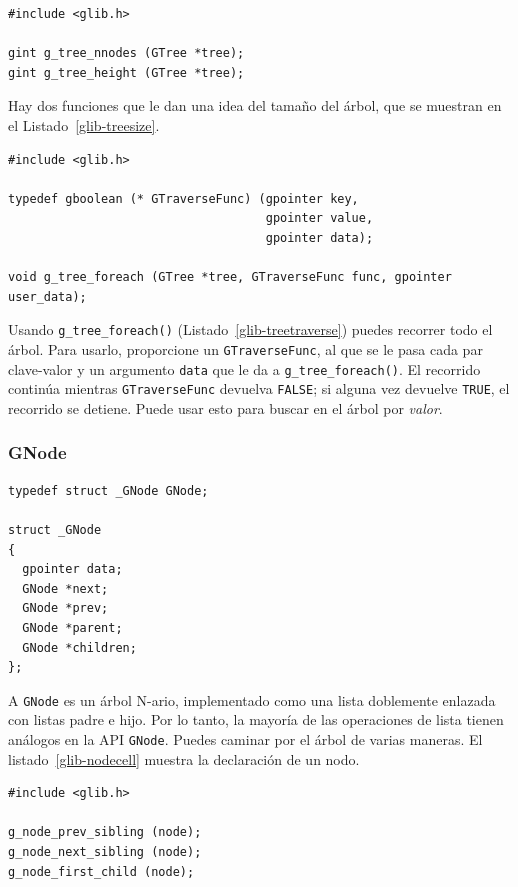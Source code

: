 \begin{lstlisting}[float, caption={Determinar el tamaño de un \lstinline{GTree}}, label=glib-treesize]
#include <glib.h>

gint g_tree_nnodes (GTree *tree);
gint g_tree_height (GTree *tree);
\end{lstlisting}

Hay dos funciones que le dan una idea del tamaño del árbol, que se muestran en el Listado~\ref{glib-treesize}.

\begin{lstlisting}[float, caption={Atravesando un \lstinline{GTree}}, label=glib-treetraverse]
#include <glib.h>

typedef gboolean (* GTraverseFunc) (gpointer key,
                                    gpointer value,
                                    gpointer data);

void g_tree_foreach (GTree *tree, GTraverseFunc func, gpointer user_data);
\end{lstlisting}

Usando \lstinline{g_tree_foreach()} (Listado~\ref{glib-treetraverse}) puedes recorrer todo el árbol. Para usarlo, proporcione un \lstinline{GTraverseFunc}, al que se le pasa cada par clave-valor y un argumento \lstinline{data} que le da a \lstinline{g_tree_foreach()}. El recorrido continúa mientras \lstinline{GTraverseFunc} devuelva \lstinline{FALSE}; si alguna vez devuelve \lstinline{TRUE}, el recorrido se detiene. Puede usar esto para buscar en el árbol por \emph{valor}.

\subsubsection{GNode}

\begin{lstlisting}[float, caption={Celda \lstinline{GNode}}, label=glib-nodecell]
typedef struct _GNode GNode;

struct _GNode
{
  gpointer data;
  GNode *next;
  GNode *prev;
  GNode *parent;
  GNode *children;
};
\end{lstlisting}

A \lstinline{GNode} es un árbol N-ario, implementado como una lista doblemente enlazada con listas padre e hijo. Por lo tanto, la mayoría de las operaciones de lista tienen análogos en la API \lstinline{GNode}. Puedes caminar por el árbol de varias maneras. El listado~\ref{glib-nodecell} muestra la declaración de un nodo.

\begin{lstlisting}[float, caption={Accediendo a \lstinline{GNode}}, label=glib-nodeaccess]
#include <glib.h>

g_node_prev_sibling (node);
g_node_next_sibling (node);
g_node_first_child (node);
\end{lstlisting}

